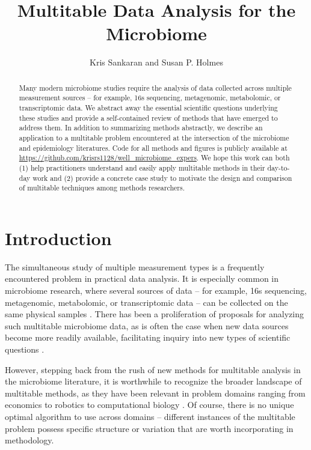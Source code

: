 \documentclass{article}
\title{Multitable Data Analysis for the Microbiome}
\author{Kris Sankaran and Susan P. Holmes}
\begin{document}
\maketitle

\begin{abstract}
  Many modern microbiome studies require the analysis of data collected across
  multiple measurement sources -- for example, 16s sequencing, metagenomic,
  metabolomic, or transcriptomic data. We abstract away the essential scientific
  questions underlying these studies and provide a self-contained review of
  methods that have emerged to address them. In addition to summarizing methods
  abstractly, we describe an application to a multitable problem encountered at
  the intersection of the microbiome and epidemiology literatures. Code for all
  methods and figures is publicly available at
  \url{https://github.com/krisrs1128/well\_microbiome\_expers}. We hope this
  work can both (1) help practitioners understand and easily apply multitable
  methods in their day-to-day work and (2) provide a concrete case study to
  motivate the design and comparison of multitable techniques among methods
  researchers.
\end{abstract}

\tableofcontents

\section{Introduction}

The simultaneous study of multiple measurement types is a frequently encountered
problem in practical data analysis. It is especially common in microbiome
research, where several sources of data -- for example, 16s sequencing,
metagenomic, metabolomic, or transcriptomic data -- can be collected on the same
physical samples \citep{McHardy2013, Franzosa2015}. There has been a
proliferation of proposals for analyzing such multitable microbiome data, as is
often the case when new data sources become more readily available, facilitating
inquiry into new types of scientific questions \citep{Fukuyama2017,
  Rahnavard2017, Chaudhary2017, Chalise2017}.

However, stepping back from the rush of new methods for multitable analysis in
the microbiome literature, it is worthwhile to recognize the broader landscape
of multitable methods, as they have been relevant in problem domains ranging
from economics \citep{hannan1967canonical} to robotics
\citep{vlassis2000supervised} to computational biology \citep{gomez2014data}. Of
course, there is no unique optimal algorithm to use across domains -- different
instances of the multitable problem possess specific structure or variation
that are worth incorporating in methodology.
\end{document}
